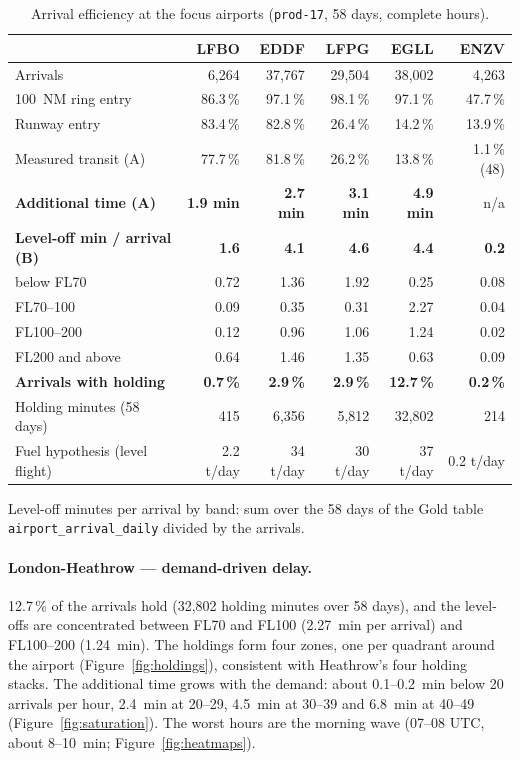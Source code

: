 \documentclass[11pt,a4paper]{article}
\begin{document}
\begin{table}[htbp]
\centering
\small
\caption{Arrival efficiency at the focus airports (\texttt{prod-17}, 58 days, complete hours).}
\label{tab:results}
\footnotesize
\begin{tabular}{lrrrrr}
\toprule
 & \textbf{LFBO} & \textbf{EDDF} & \textbf{LFPG} & \textbf{EGLL} & \textbf{ENZV} \\
\midrule
Arrivals & 6,264 & 37,767 & 29,504 & 38,002 & 4,263 \\
100~NM ring entry & 86.3\,\% & 97.1\,\% & 98.1\,\% & 97.1\,\% & 47.7\,\% \\
Runway entry & 83.4\,\% & 82.8\,\% & 26.4\,\% & 14.2\,\% & 13.9\,\% \\
Measured transit (A) & 77.7\,\% & 81.8\,\% & 26.2\,\% & 13.8\,\% & 1.1\,\% (48) \\
\textbf{Additional time (A)} & \textbf{1.9 min} & \textbf{2.7 min} & \textbf{3.1 min} & \textbf{4.9 min} & n/a \\
\textbf{Level-off min / arrival (B)} & \textbf{1.6} & \textbf{4.1} & \textbf{4.6} & \textbf{4.4} & \textbf{0.2} \\
\quad below FL70 & 0.72 & 1.36 & 1.92 & 0.25 & 0.08 \\
\quad FL70--100 & 0.09 & 0.35 & 0.31 & 2.27 & 0.04 \\
\quad FL100--200 & 0.12 & 0.96 & 1.06 & 1.24 & 0.02 \\
\quad FL200 and above & 0.64 & 1.46 & 1.35 & 0.63 & 0.09 \\
\textbf{Arrivals with holding} & \textbf{0.7\,\%} & \textbf{2.9\,\%} & \textbf{2.9\,\%} & \textbf{12.7\,\%} & \textbf{0.2\,\%} \\
Holding minutes (58 days) & 415 & 6,356 & 5,812 & 32,802 & 214 \\
Fuel hypothesis (level flight) & 2.2 t/day & 34 t/day & 30 t/day & 37 t/day & 0.2 t/day \\
\bottomrule
\end{tabular}

\smallskip
\footnotesize Level-off minutes per arrival by band: sum over the 58 days of the Gold table \texttt{airport\_arrival\_daily} divided by the arrivals.
\end{table}


\paragraph{London-Heathrow --- demand-driven delay.}
12.7\,\% of the arrivals hold (32,802 holding minutes over 58 days), and the level-offs are concentrated between FL70 and FL100 (2.27~min per arrival) and FL100--200 (1.24~min). The holdings form four zones, one per quadrant around the airport (Figure~\ref{fig:holdings}), consistent with Heathrow's four holding stacks. The additional time grows with the demand: about 0.1--0.2~min below 20 arrivals per hour, 2.4~min at 20--29, 4.5~min at 30--39 and 6.8~min at 40--49 (Figure~\ref{fig:saturation}). The worst hours are the morning wave (07--08 UTC, about 8--10~min; Figure~\ref{fig:heatmaps}).
\end{document}
